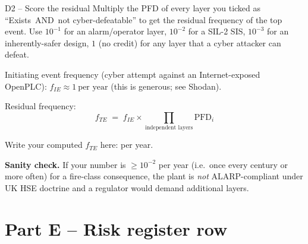 \documentclass[11pt,a4paper]{article}
\begin{document}
\begin{stepbox}{D2 -- Score the residual}
Multiply the PFD of every layer you ticked as ``Exists~AND~not cyber-defeatable'' to get the residual frequency of the top event. Use $10^{-1}$ for an alarm/operator layer, $10^{-2}$ for a SIL-2 SIS, $10^{-3}$ for an inherently-safer design, $1$ (no credit) for any layer that a cyber attacker can defeat.

\medskip
Initiating event frequency (cyber attempt against an Internet-exposed OpenPLC):
$f_{\textit{IE}} \approx 1\ \text{per year}$ (this is generous; see Shodan).

\medskip
Residual frequency:
\[
f_{\textit{TE}} \;=\; f_{\textit{IE}} \times \prod_{\text{independent layers}} \text{PFD}_i
\]

Write your computed $f_{\textit{TE}}$ here: \underline{\hspace{60mm}} per year.

\medskip\noindent
\textbf{Sanity check.} If your number is $\geq 10^{-2}$ per year (i.e.\ once every century or more often) for a fire-class consequence, the plant is \emph{not} ALARP-compliant under UK HSE doctrine and a regulator would demand additional layers.
\end{stepbox}

\section*{Part E -- Risk register row}
\end{document}
